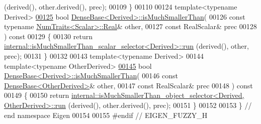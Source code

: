 \begin{DoxyCode}
      (derived(), other.derived(), prec);
00109 \}
00110 
00124 \textcolor{keyword}{template}<\textcolor{keyword}{typename} Derived>
\hyperlink{group___core___module_adfca6ff4e473f68fbbeabbd03b7504a9}{00125} \textcolor{keywordtype}{bool} \hyperlink{group___core___module_class_eigen_1_1_dense_base}{DenseBase<Derived>::isMuchSmallerThan}(
00126   \textcolor{keyword}{const} \textcolor{keyword}{typename} \hyperlink{group___core___module_struct_eigen_1_1_num_traits}{NumTraits<Scalar>::Real}& other,
00127   \textcolor{keyword}{const} RealScalar& prec
00128 )\textcolor{keyword}{ const}
00129 \textcolor{keyword}{}\{
00130   \textcolor{keywordflow}{return} \hyperlink{struct_eigen_1_1internal_1_1is_much_smaller_than__scalar__selector}{internal::isMuchSmallerThan\_scalar\_selector<Derived>::run}
      (derived(), other, prec);
00131 \}
00132 
00143 \textcolor{keyword}{template}<\textcolor{keyword}{typename} Derived>
00144 \textcolor{keyword}{template}<\textcolor{keyword}{typename} OtherDerived>
\hyperlink{group___core___module_a7d61b8814a7547e88b25cba68b159f05}{00145} \textcolor{keywordtype}{bool} \hyperlink{group___core___module_class_eigen_1_1_dense_base}{DenseBase<Derived>::isMuchSmallerThan}(
00146   \textcolor{keyword}{const} \hyperlink{group___core___module_class_eigen_1_1_dense_base}{DenseBase<OtherDerived>}& other,
00147   \textcolor{keyword}{const} RealScalar& prec
00148 )\textcolor{keyword}{ const}
00149 \textcolor{keyword}{}\{
00150   \textcolor{keywordflow}{return} \hyperlink{struct_eigen_1_1internal_1_1is_much_smaller_than__object__selector}{internal::isMuchSmallerThan\_object\_selector<Derived, OtherDerived>::run}
      (derived(), other.derived(), prec);
00151 \}
00152 
00153 \} \textcolor{comment}{// end namespace Eigen}
00154 
00155 \textcolor{preprocessor}{#endif // EIGEN\_FUZZY\_H}
\end{DoxyCode}
